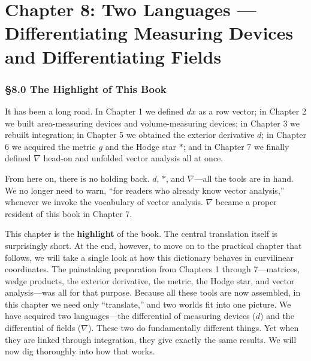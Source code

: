 \documentclass[a4paper,12pt,openany]{book}
\begin{document}
\hypertarget{chapter-8-two-languages-differentiating-measuring-devices-and-differentiating-fields}{%
\chapter{Chapter 8: Two Languages — Differentiating Measuring Devices
and Differentiating
Fields}\label{chapter-8-two-languages-differentiating-measuring-devices-and-differentiating-fields}}

\hypertarget{the-highlight-of-this-book}{%
\subsection{§8.0 The Highlight of This
Book}\label{the-highlight-of-this-book}}

It has been a long road. In Chapter 1 we defined \(dx\) as a row vector;
in Chapter 2 we built area-measuring devices and volume-measuring
devices; in Chapter 3 we rebuilt integration; in Chapter 5 we obtained
the exterior derivative \(d\); in Chapter 6 we acquired the metric \(g\)
and the Hodge star \(\ast\); and in Chapter 7 we finally defined
\(\nabla\) head-on and unfolded vector analysis all at once.

From here on, there is no holding back. \(d\), \(\ast\), and
\(\nabla\)—all the tools are in hand. We no longer need to warn, ``for
readers who already know vector analysis,'' whenever we invoke the
vocabulary of vector analysis. \(\nabla\) became a proper resident of
this book in Chapter 7.

This chapter is the \textbf{highlight} of the book. The central
translation itself is surprisingly short. At the end, however, to move
on to the practical chapter that follows, we will take a single look at
how this dictionary behaves in curvilinear coordinates. The painstaking
preparation from Chapters 1 through 7—matrices, wedge products, the
exterior derivative, the metric, the Hodge star, and vector
analysis—was all for that purpose. Because all these tools are now
assembled, in this chapter we need only ``translate,'' and two worlds
fit into one picture. We have acquired two languages—the differential
of measuring devices (\(d\)) and the differential of fields
(\(\nabla\)). These two do fundamentally different things. Yet when they
are linked through integration, they give exactly the same results. We
will now dig thoroughly into how that works.

\par\vspace{0.35em}\par
\end{document}
